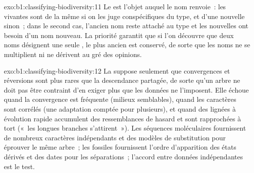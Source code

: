 \begin{solution}{exo:b1:classifying-biodiversity:11}
Le  est l'objet auquel le nom renvoie~: les 
vivantes sont de la même  si on les juge conspécifiques du type,
et d'une  nouvelle sinon~; dans le second cas, l'ancien nom reste
attaché au type et les nouvelles  ont besoin d'un nom
nouveau. La priorité garantit que si l'on découvre que deux noms
désignent une seule , le plus ancien est conservé, de sorte que
les noms ne se multiplient ni ne dérivent au gré des opinions.
\end{solution}

\begin{solution}{exo:b1:classifying-biodiversity:12}
La  suppose seulement que convergences et réversions sont
plus rares que la descendance partagée, de sorte qu'un arbre ne doit
pas être contraint d'en exiger plus que les données ne l'imposent. Elle
échoue quand la convergence est fréquente (milieux semblables), quand
les caractères sont corrélés (une adaptation comptée pour plusieurs),
et quand des lignées à évolution rapide accumulent des ressemblances de
hasard et sont rapprochées à tort («~les longues branches
s'attirent~»). Les séquences moléculaires fournissent de nombreux
caractères indépendants et des modèles de substitution pour éprouver le
même arbre~; les fossiles fournissent l'ordre d'apparition des états
dérivés et des dates pour les séparations~; l'accord entre données
indépendantes est le test.
\end{solution}

